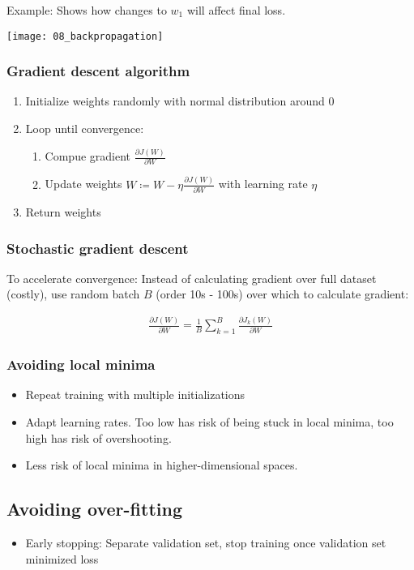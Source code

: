 Example: Shows how changes to $w_1$ will affect final loss.

\texttt{[image: 08\_backpropagation]}

\subsubsection{Gradient descent algorithm}

\begin{enumerate}
		\item Initialize weights randomly with normal distribution around $0$
		\item Loop until convergence:
				\begin{enumerate}
						\item Compue gradient $\frac{\partial J(W)}{\partial W}$
						\item Update weights $W \coloneqq W - \eta
								\frac{\partial J(W)}{\partial W}$ with learning
								rate $\eta$
				\end{enumerate}
		\item Return weights
\end{enumerate}

\subsubsection{Stochastic gradient descent}

To accelerate convergence: Instead of calculating gradient over full dataset
(costly), use random batch $B$ (order 10s - 100s) over which to calculate
gradient:

\begin{align*}
		\frac{\partial J(W)}{\partial W} = \frac{1}{B} \sum_{k = 1}^B \frac{\partial J_k(W)}{\partial W}
\end{align*}

\subsubsection{Avoiding local minima}

\begin{itemize}
		\item Repeat training with multiple initializations
		\item Adapt learning rates. Too low has risk of being stuck in local
				minima, too high has risk of overshooting.
		\item Less risk of local minima in higher-dimensional spaces.
\end{itemize}

\subsection{Avoiding over-fitting}

\begin{itemize}
		\itemize Dropout: Randomly set certain weights per layer to 0, prevent
				network from becoming too complex
		\item Early stopping: Separate validation set, stop training once
				validation set minimized loss
\end{itemize}
